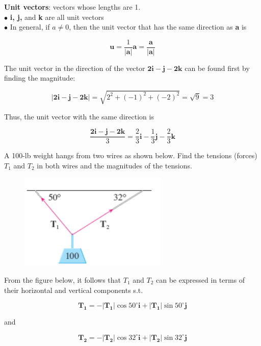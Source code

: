         \textbf{Unit vectors}: vectors whose lengths are 1. \\
        $\bullet$ \textbf{i, j,} and \textbf{k} are all unit vectors \\
        $\bullet$ In general, if $a\not = 0$, then the unit vector that has the same direction as \textbf{a} is

        \[
            \mathbf{u} = \frac{1}{|\mathbf{a}|}\mathbf{a} = \frac{\mathbf{a}}{|\mathbf{a}|}
        \]

        \textit{} The unit vector in the direction of the vector $\mathbf{2i - j - 2k}$ can be found first by finding the magnitude:

        \[
            |\mathbf{2i - j - 2k}| = \sqrt{2^2 + (-1)^2 + (-2)^2} = \sqrt{9} = 3
        \]

        Thus, the unit vector with the same direction is

        \[
            \frac{\mathbf{2i-j-2k}}{3} = \frac{2}{3}\mathbf{i} - \frac{1}{3}\mathbf{j} - \frac{2}{3}\mathbf{k}
        \]

        \textit{} A 100-lb weight hangs from two wires as shown below. Find the tensions (forces) $T_1$ and $T_2$ in both wires and the magnitudes of the tensions.

        \begin{figure}[hbt!]
            \centering
            \includegraphics[scale = 0.75]{Resources/12.2_Tension}
        \end{figure}

        From the figure below, it follows that $T_1$ and $T_2$ can be expressed in terms of their horizontal and vertical components s.t.

        \[
            \mathbf{T_1} = -|\mathbf{T_1}|\cos{50^{\circ}}\mathbf{i} + |\mathbf{T_1}|\sin{50^{\circ}} \mathbf{j}
        \]

        and

        \[
            \mathbf{T_2} = -|\mathbf{T_2}|\cos{32^{\circ}}\mathbf{i} + |\mathbf{T_2}|\sin{32^{\circ}}\mathbf{j}
        \]

